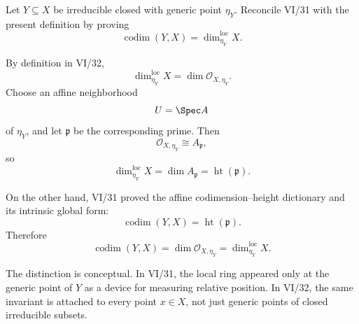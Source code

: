 \begin{problem}\label{prob:vi32-15}
Let \(Y\subseteq X\) be irreducible closed with generic point \(\eta_Y\). Reconcile VI/31 with the present definition by proving
\[
\operatorname{codim}(Y,X)=\dim_{\eta_Y}^{\mathrm{loc}}X.
\]

\end{problem}

\ifdefined\FullProblemDossiers
\begin{solution}
By definition in VI/32,
\[
\dim_{\eta_Y}^{\mathrm{loc}}X
=
\dim\mathcal O_{X,\eta_Y}.
\]
Choose an affine neighborhood
\[
U=\Spec A
\]
of \(\eta_Y\), and let \(\mathfrak p\) be the corresponding prime. Then
\[
\mathcal O_{X,\eta_Y}\cong A_{\mathfrak p},
\]
so
\[
\dim_{\eta_Y}^{\mathrm{loc}}X
=
\dim A_{\mathfrak p}
=
\operatorname{ht}(\mathfrak p).
\]

On the other hand, VI/31 proved the affine codimension--height dictionary and its intrinsic global form:
\[
\operatorname{codim}(Y,X)
=
\operatorname{ht}(\mathfrak p).
\]
Therefore
\[
\boxed{
\operatorname{codim}(Y,X)
=
\dim\mathcal O_{X,\eta_Y}
=
\dim_{\eta_Y}^{\mathrm{loc}}X.
}
\]

The distinction is conceptual. In VI/31, the local ring appeared only at the generic point of \(Y\) as a device for
measuring relative position. In VI/32, the same invariant is attached to every point \(x\in X\), not just generic
points of closed irreducible subsets.
\end{solution}
\fi
